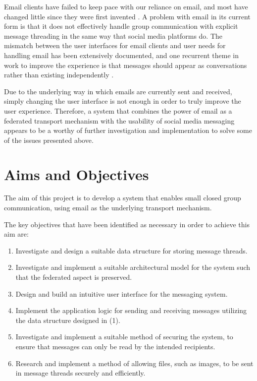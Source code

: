Email clients have failed to keep pace with our reliance on email, and most have changed little since they were first invented \cite{rohall2004}. A problem with email in its current form is that it does not effectively handle group communication with explicit message threading in the same way that social media platforms do. The mismatch between the user interfaces for email clients and user needs for handling email has been extensively documented, and one recurrent theme in work to improve the experience is that messages should appear as conversations rather than existing independently \cite{venolia2003}.

Due to the underlying way in which emails are currently sent and received, simply changing the user interface is not enough in order to truly improve the user experience. Therefore, a system that combines the power of email as a federated transport mechanism with the usability of social media messaging appears to be a worthy of further investigation and implementation to solve some of the issues presented above. 

\section{Aims and Objectives}

The aim of this project is to develop a system that enables small closed group communication, using email as the underlying transport mechanism.

The key objectives that have been identified as necessary in order to achieve this aim are:

\begin{enumerate}
  \item{Investigate and design a suitable data structure for storing message threads.}
  \item{Investigate and implement a suitable architectural model for the system such that the federated aspect is preserved.}
  \item{Design and build an intuitive user interface for the messaging system.}
  \item{Implement the application logic for sending and receiving messages utilizing the data structure designed in (1).}
  \item{Investigate and implement a suitable method of securing the system, to ensure that messages can only be read by the intended recipients.}
  \item{Research and implement a method of allowing files, such as images, to be sent in message threads securely and efficiently.}
\end{enumerate}